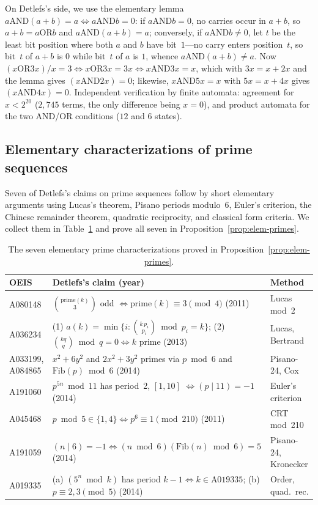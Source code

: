 \documentclass[11pt]{article}
\begin{document}
On Detlefs's side, we use the elementary lemma $a \mathbin{\mathrm{AND}} (a+b) = a \iff a \mathbin{\mathrm{AND}} b = 0$: if $a \mathbin{\mathrm{AND}} b = 0$, no carries occur in $a+b$, so $a+b = a \mathbin{\mathrm{OR}} b$ and $a \mathbin{\mathrm{AND}} (a+b) = a$; conversely, if $a \mathbin{\mathrm{AND}} b \ne 0$, let $t$ be the least bit position where both $a$ and $b$ have bit~$1$---no carry enters position~$t$, so bit~$t$ of $a+b$ is $0$ while bit~$t$ of $a$ is $1$, whence $a \mathbin{\mathrm{AND}} (a+b) \ne a$. Now $(x \mathbin{\mathrm{OR}} 3x)/x = 3 \iff x \mathbin{\mathrm{OR}} 3x = 3x \iff x \mathbin{\mathrm{AND}} 3x = x$, which with $3x = x + 2x$ and the lemma gives $(x \mathbin{\mathrm{AND}} 2x) = 0$; likewise, $x \mathbin{\mathrm{AND}} 5x = x$ with $5x = x + 4x$ gives $(x \mathbin{\mathrm{AND}} 4x) = 0$. Independent verification by
finite automata: agreement for $x < 2^{20}$ ($2{,}745$ terms, the only
difference being $x = 0$), and product automata for the two AND/OR
conditions ($12$ and $6$ states).

\subsection{Elementary characterizations of prime sequences}
\label{sec:elem-primes}

Seven of Detlefs's claims on prime sequences follow by short elementary arguments using Lucas's theorem, Pisano periods modulo~6, Euler's criterion, the Chinese remainder theorem, quadratic reciprocity, and classical form criteria. We collect them in Table~\ref{tab:elem-primes} and prove all seven in Proposition~\ref{prop:elem-primes}.

\begin{table}[ht]
\centering
\small
\begin{tabular}{lll}
\hline
OEIS & Detlefs's claim (year) & Method \\
\hline
A080148 & $\binom{\mathrm{prime}(k)}{3}$ odd $\iff \mathrm{prime}(k) \equiv 3 \pmod{4}$ (2011) & Lucas mod~2 \\
A036234 & (1) $a(k)=\min\{i:\binom{k\,p_i}{p_i}\bmod p_i = k\}$; (2) $\binom{kq}{q}\bmod q = 0 \iff k$ prime (2013) & Lucas, Bertrand \\
A033199, A084865 & $x^2+6y^2$ and $2x^2+3y^2$ primes via $p \bmod 6$ and $\mathrm{Fib}(p) \bmod 6$ (2014) & Pisano-24, Cox \\
A191060 & $p^{5n} \bmod 11$ has period~2, $[1,10]$ $\iff (p \mid 11)=-1$ (2014) & Euler's criterion \\
A045468 & $p \bmod 5 \in \{1,4\} \iff p^6 \equiv 1 \pmod{210}$ (2011) & CRT mod~210 \\
A191059 & $(n \mid 6)=-1 \iff (n \bmod 6)(\mathrm{Fib}(n) \bmod 6) = 5$ (2014) & Pisano-24, Kronecker \\
A019335 & (a) $(5^n \bmod k)$ has period $k-1 \iff k \in \text{A019335}$; (b) $p \equiv 2,3 \pmod{5}$ (2014) & Order, quad.\ rec. \\
\hline
\end{tabular}
\caption{The seven elementary prime characterizations proved in Proposition~\ref{prop:elem-primes}.}
\label{tab:elem-primes}
\end{table}
\end{document}
